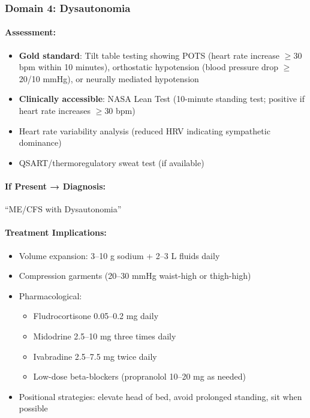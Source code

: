 \subsubsection{Domain 4: Dysautonomia}

\paragraph{Assessment:}
\begin{itemize}
    \item \textbf{Gold standard}: Tilt table testing showing POTS (heart rate increase $\geq$30 bpm within 10 minutes), orthostatic hypotension (blood pressure drop $\geq$20/10 mmHg), or neurally mediated hypotension
    \item \textbf{Clinically accessible}: NASA Lean Test (10-minute standing test; positive if heart rate increases $\geq$30 bpm)
    \item Heart rate variability analysis (reduced HRV indicating sympathetic dominance)
    \item QSART/thermoregulatory sweat test (if available)
\end{itemize}

\paragraph{If Present → Diagnosis:} ``ME/CFS with Dysautonomia''

\paragraph{Treatment Implications:}
\begin{itemize}
    \item Volume expansion: 3--10 g sodium + 2--3 L fluids daily
    \item Compression garments (20--30 mmHg waist-high or thigh-high)
    \item Pharmacological:
    \begin{itemize}
        \item Fludrocortisone 0.05--0.2 mg daily
        \item Midodrine 2.5--10 mg three times daily
        \item Ivabradine 2.5--7.5 mg twice daily
        \item Low-dose beta-blockers (propranolol 10--20 mg as needed)
    \end{itemize}
    \item Positional strategies: elevate head of bed, avoid prolonged standing, sit when possible
\end{itemize}

